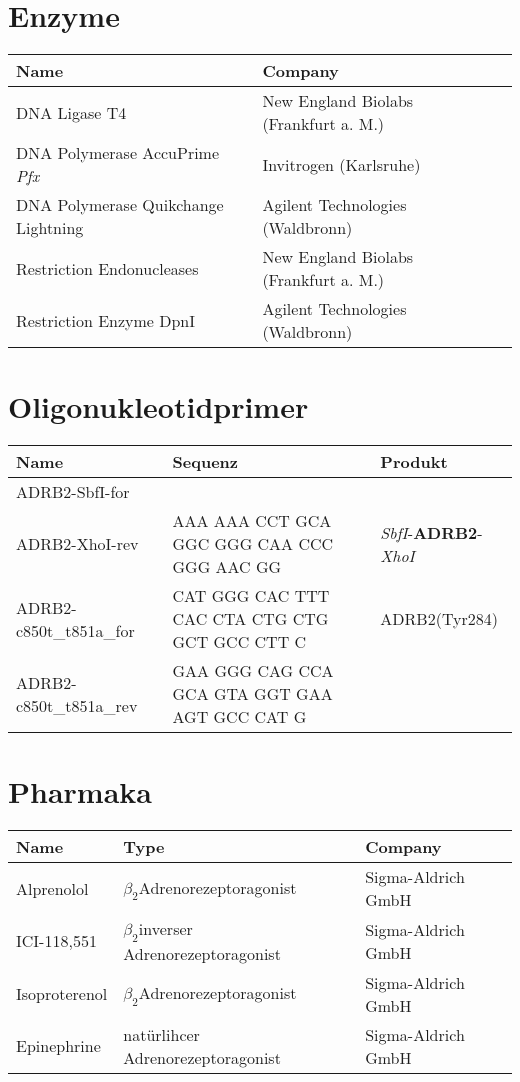 \section{Enzyme}

\begin{tabular}{lll}
\toprule
Name							&	Company\\
\midrule
DNA Ligase T4						&	New England Biolabs (Frankfurt a. M.)\\
DNA Polymerase AccuPrime \textit{Pfx}	&	Invitrogen (Karlsruhe)\\
DNA Polymerase Quikchange Lightning	&	Agilent Technologies (Waldbronn)\\
Restriction Endonucleases			&	New England Biolabs (Frankfurt a. M.)\\
Restriction Enzyme DpnI				&	Agilent Technologies (Waldbronn)\\
\bottomrule
		
\end {tabular}


\section{Oligonukleotidprimer}

\begin{tabular}{lll}
\toprule
Name		&	Sequenz 					&	Produkt\\
\midrule
ADRB2-SbfI-for	&&\\
ADRB2-XhoI-rev	&	AAA AAA CCT GCA GGC GGG CAA CCC GGG AAC GG	&	\textit{SbfI}-\textbf{ADRB2}-\textit{XhoI}\\
ADRB2-c850t\_t851a\_for	& 	CAT GGG CAC TTT CAC CTA CTG CTG GCT GCC CTT C & ADRB2(Tyr284)\\
ADRB2-c850t\_t851a\_rev	&	GAA GGG CAG CCA GCA GTA GGT GAA AGT GCC CAT G &\\
\bottomrule
\end{tabular}

\section{Pharmaka}
\begin{tabular}{lll}
\toprule
Name			&	Type										&	Company\\
\midrule
Alprenolol		&	$\beta_2$\-Adrenorezeptoragonist				&	Sigma-Aldrich GmbH\\
ICI-118,551		&	$\beta_2$\-inverser Adrenorezeptoragonist		&	Sigma-Aldrich GmbH\\
Isoproterenol	&	$\beta_2$\-Adrenorezeptoragonist				&	Sigma-Aldrich GmbH\\
Epinephrine		&	natürlihcer Adrenorezeptoragonist			& 	Sigma-Aldrich GmbH\\
\bottomrule

\end{tabular}